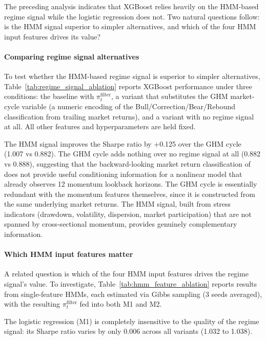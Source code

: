 The preceding analysis indicates that XGBoost relies heavily on the HMM-based regime signal while the logistic regression does not. Two natural questions follow: is the HMM signal superior to simpler alternatives, and which of the four HMM input features drives its value?

\paragraph{Comparing regime signal alternatives}

To test whether the HMM-based regime signal is superior to simpler alternatives, Table~\ref{tab:regime_signal_ablation} reports XGBoost performance under three conditions: the baseline with $\pi_t^{\text{filter}}$, a variant that substitutes the GHM market-cycle variable (a numeric encoding of the Bull/Correction/Bear/Rebound classification from trailing market returns), and a variant with no regime signal at all. All other features and hyperparameters are held fixed.



The HMM signal improves the Sharpe ratio by +0.125 over the GHM cycle (1.007 vs 0.882). The GHM cycle adds nothing over no regime signal at all (0.882 vs 0.888), suggesting that the backward-looking market return classification of \citet{GHM2023} does not provide useful conditioning information for a nonlinear model that already observes 12 momentum lookback horizons. The GHM cycle is essentially redundant with the momentum features themselves, since it is constructed from the same underlying market returns. The HMM signal, built from stress indicators (drawdown, volatility, dispersion, market participation) that are not spanned by cross-sectional momentum, provides genuinely complementary information.

\paragraph{Which HMM input features matter}

A related question is which of the four HMM input features drives the regime signal's value. To investigate, Table~\ref{tab:hmm_feature_ablation} reports results from single-feature HMMs, each estimated via Gibbs sampling (3 seeds averaged), with the resulting $\pi_t^{\text{filter}}$ fed into both M1 and M2.



The logistic regression (M1) is completely insensitive to the quality of the regime signal: its Sharpe ratio varies by only 0.006 across all variants (1.032 to 1.038).

